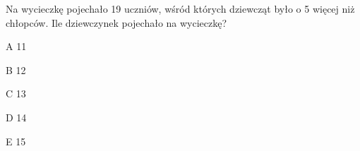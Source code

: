 \begin{tresc}
Na wycieczkę pojechało 19 uczniów, wśród których dziewcząt było o 5 więcej niż chłopców. Ile dziewczynek pojechało na wycieczkę?
\end{tresc}
\begin{wariant}{A} 11 \end{wariant}
\begin{wariant}{B} 12 \end{wariant}
\begin{wariant}{C} 13 \end{wariant}
\begin{wariant}{D} 14 \end{wariant}
\begin{wariant}{E} 15 \end{wariant}
